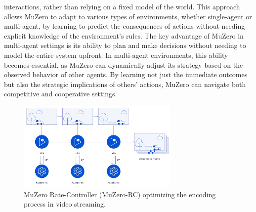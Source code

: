 interactions, rather than relying on a fixed model of the world. This approach
allows MuZero to adapt to various types of environments, whether single-agent
or multi-agent, by learning to predict the consequences of actions without
needing explicit knowledge of the environment’s rules. The key advantage of
MuZero in multi-agent settings is its ability to plan and make decisions
without needing to model the entire system upfront. In multi-agent
environments, this ability becomes essential, as MuZero can dynamically adjust
its strategy based on the observed behavior of other agents. By learning not
just the immediate outcomes but also the strategic implications of others'
actions, MuZero can navigate both competitive and cooperative settings.
\begin{figure}[t]
    \centering
    \includegraphics[width=0.7\textwidth]{sections/9Future Directions/MuZeroRC.png}
    \caption{MuZero Rate-Controller (MuZero-RC) optimizing the encoding process in video streaming.}
\end{figure}